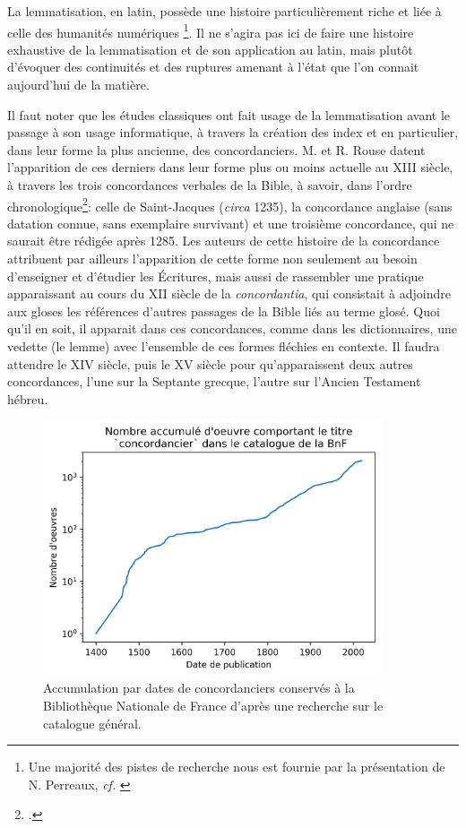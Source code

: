 La lemmatisation, en latin, possède une histoire particulièrement riche et liée à celle des humanités numériques \footnote{Une majorité des pistes de recherche nous est fournie par la présentation de N. Perreaux, \textit{cf.} \cite{perreaux_lemmatisation_2019}}. Il ne s'agira pas ici de faire une histoire exhaustive de la lemmatisation et de son application au latin, mais plutôt d'évoquer des continuités et des ruptures amenant à l'état que l'on connait aujourd'hui de la matière.

Il faut noter que les études classiques ont fait usage de la lemmatisation avant le passage à son usage informatique, à travers la création des index et en particulier, dans leur forme la plus ancienne, des concordanciers. M. et R. Rouse datent l'apparition de ces derniers dans leur forme plus ou moins actuelle au XIII siècle, à travers les trois concordances verbales de la Bible, à savoir, dans l'ordre chronologique\footcite{rouse_concordance_1984}: celle de Saint-Jacques (\textit{circa} 1235), la concordance anglaise (sans datation connue, sans exemplaire survivant) et une troisième concordance, qui ne saurait être rédigée après 1285. Les auteurs de cette histoire de la concordance attribuent par ailleurs l'apparition de cette forme non seulement au besoin d'enseigner et d'étudier les Écritures, mais aussi de rassembler une pratique apparaissant au cours du XII siècle de la \textit{concordantia}, qui consistait à adjoindre aux gloses les références d'autres passages de la Bible liés au terme glosé. Quoi qu'il en soit, il apparait dans ces concordances, comme dans les dictionnaires, une vedette (le lemme) avec l'ensemble de ces formes fléchies en contexte. Il faudra attendre le XIV siècle, puis le XV siècle pour qu'apparaissent deux autres concordances, l'une sur la Septante grecque, l'autre sur l'Ancien Testament hébreu.

\begin{figure}[h]
    \centering
    \includegraphics[width=10cm]{results/lemmatisation/histoire/concordanciers.png}
    \caption{Accumulation par dates de concordanciers conservés à la Bibliothèque Nationale de France d'après une recherche sur le catalogue général.}
    \label{lemmatisation:concordanciers}
\end{figure}

